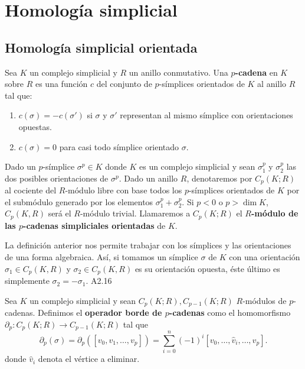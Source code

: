 
\chapter{Homología simplicial}

\section{Homología simplicial orientada}
 \begin{definicion}
 	Sea $K$ un complejo simplicial y $R$ un anillo conmutativo. Una \textbf{$p$-cadena} en $K$ sobre $R$ es una función $c$ del conjunto de $p$-símplices orientados de $K$ al anillo $R$ tal que:
 	\begin{enumerate}
 		\item $c(\sigma) = -c(\sigma')$ si $\sigma$ y $\sigma'$ representan al mismo símplice con orientaciones opuestas.
 		\item $c(\sigma) = 0$ para casi todo símplice orientado $\sigma$.
 	\end{enumerate}
 \end{definicion}
 
Dado un $p$-símplice $\sigma^p \in K$ donde $K$ es un complejo simplicial y sean $\sigma^p_1$ y $\sigma^p_2$ las dos posibles orientaciones de $\sigma^p$. Dado un anillo $R$, denotaremos por $C_p(K;R)$ al cociente del $R$-módulo libre con base todos los $p$-símplices orientados de $K$ por el submódulo generado por los elementos  $\sigma^p_1+\sigma^p_2$. Si $p<0$ o $p > \dim{K}$, $C_p(K,R)$ será el $R$-módulo trivial. Llamaremos a $C_p(K;R)$ el \textbf{$R$-módulo de las $p$-cadenas simpliciales orientadas} de $K$.
\begin{observacion}
	La definición anterior nos permite trabajar con los símplices y las orientaciones de una forma algebraica. Así, si tomamos un símplice $\sigma$ de $K$ con una orientación $\sigma_1 \in C_p(K,R)$ y $\sigma_2 \in C_p(K,R)$ es su orientación opuesta, éste último es simplemente $\sigma_2 = -\sigma_1$. A2.16
\end{observacion}
\begin{definicion}
	Sea $K$ un complejo simplicial y sean $C_p(K;R), C_{p-1}(K;R)$ $R$-módulos de $p$-cadenas. Definimos el \textbf{operador borde de $p$-cadenas} como el homomorfismo \(\partial_p : C_p(K;R) \to C_{p-1}(K;R)\) tal que
	\[
		\partial_p(\sigma) = \partial_p([v_0, v_1, \ldots, v_p]) = \sum_{i=0}^{n} (-1)^i[v_0, \ldots, \hat{v}_i, \ldots, v_p] .
	\]
	donde \(\hat{v}_i\) denota el vértice a eliminar.
\end{definicion}

